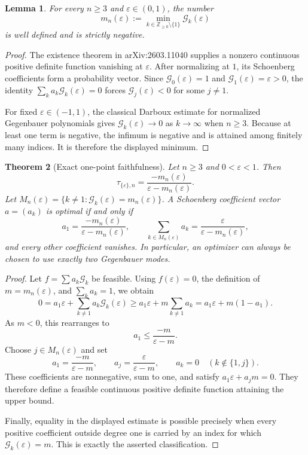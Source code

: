 \documentclass[11pt]{article}
\newtheorem{theorem}{Theorem}
\newtheorem{lemma}[theorem]{Lemma}
\newcommand{\G}{\mathcal G}
\begin{document}
\begin{lemma}\label{lem:min}
For every \(n\geq3\) and \(\varepsilon\in(0,1)\), the number
\[
  m_n(\varepsilon)
  :=\min_{k\in\mathbb Z_{\geq0}\setminus\{1\}}\G_k(\varepsilon)
\]
is well defined and is strictly negative.
\end{lemma}

\begin{proof}
The existence theorem in arXiv:2603.11040 supplies a nonzero continuous
positive definite function vanishing at \(\varepsilon\).  After normalizing
at \(1\), its Schoenberg coefficients form a probability vector.  Since
\(\G_0(\varepsilon)=1\) and \(\G_1(\varepsilon)=\varepsilon>0\), the identity
\(\sum_k a_k\G_k(\varepsilon)=0\) forces
\(\G_j(\varepsilon)<0\) for some \(j\ne1\).

For fixed \(\varepsilon\in(-1,1)\), the classical Darboux estimate for
normalized Gegenbauer polynomials gives
\(\G_k(\varepsilon)\to0\) as \(k\to\infty\) when \(n\geq3\).  Because at
least one term is negative, the infimum is negative and is attained among
finitely many indices.  It is therefore the displayed minimum.
\end{proof}

\begin{theorem}[Exact one-point faithfulness]\label{thm:exact}
Let \(n\geq3\) and \(0<\varepsilon<1\).  Then
\[
 \boxed{\displaystyle
 \tau_{\{\varepsilon\},n}
 =\frac{-m_n(\varepsilon)}
        {\varepsilon-m_n(\varepsilon)}}.
\]
Let
\(M_n(\varepsilon)=\{k\ne1:\G_k(\varepsilon)=m_n(\varepsilon)\}\).
A Schoenberg coefficient vector \(a=(a_k)\) is optimal if and only if
\[
 a_1=\frac{-m_n(\varepsilon)}
           {\varepsilon-m_n(\varepsilon)},
 \qquad
 \sum_{k\in M_n(\varepsilon)}a_k
   =\frac{\varepsilon}{\varepsilon-m_n(\varepsilon)},
\]
and every other coefficient vanishes.  In particular, an optimizer can
always be chosen to use exactly two Gegenbauer modes.
\end{theorem}

\begin{proof}
Let \(f=\sum a_k\G_k\) be feasible.  Using \(f(\varepsilon)=0\), the
definition of \(m=m_n(\varepsilon)\), and \(\sum_k a_k=1\), we obtain
\[
 0=a_1\varepsilon+\sum_{k\ne1}a_k\G_k(\varepsilon)
 \geq a_1\varepsilon+m\sum_{k\ne1}a_k
 =a_1\varepsilon+m(1-a_1).
\]
As \(m<0\), this rearranges to
\[
 a_1\leq\frac{-m}{\varepsilon-m}.
\]
Choose \(j\in M_n(\varepsilon)\) and set
\[
 a_1=\frac{-m}{\varepsilon-m},
 \qquad
 a_j=\frac{\varepsilon}{\varepsilon-m},
 \qquad a_k=0\quad(k\notin\{1,j\}).
\]
These coefficients are nonnegative, sum to one, and satisfy
\(a_1\varepsilon+a_jm=0\).  They therefore define a feasible continuous
positive definite function attaining the upper bound.

Finally, equality in the displayed estimate is possible precisely when
every positive coefficient outside degree one is carried by an index for
which \(\G_k(\varepsilon)=m\).  This is exactly the asserted classification.
\end{proof}
\end{document}
